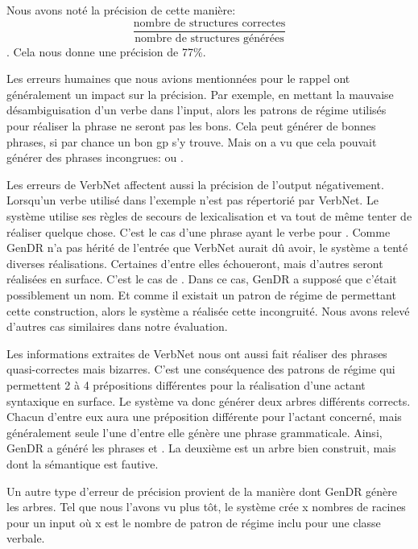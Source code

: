 Nous avons noté la précision de cette manière:\[\frac{\text{nombre de structures correctes}}{\text{nombre de structures générées}}\]. Cela nous donne une précision de 77\%.

Les erreurs humaines que nous avions mentionnées pour le rappel ont généralement un impact sur la précision. Par exemple, en mettant la mauvaise désambiguisation d'un verbe dans l'input, alors les patrons de régime utilisés pour réaliser la phrase ne seront pas les bons. Cela peut générer de bonnes phrases, si par chance un bon gp s'y trouve. Mais on a vu que cela pouvait générer des phrases incongrues:  ou .

Les erreurs de VerbNet affectent aussi la précision de l'output négativement. Lorsqu'un verbe utilisé dans l'exemple n'est pas répertorié par VerbNet. Le système utilise ses règles de secours de lexicalisation et va tout de même tenter de réaliser quelque chose. C'est le cas d'une phrase ayant le verbe  pour . Comme GenDR n'a pas hérité de l'entrée que VerbNet aurait dû avoir, le système a tenté diverses réalisations. Certaines d'entre elles échoueront, mais d'autres seront réalisées en surface. C'est le cas de . Dans ce cas, GenDR a supposé que c'était possiblement un nom. Et comme il existait un patron de régime de  permettant cette construction, alors le système a réalisée cette incongruité. Nous avons relevé d'autres cas similaires dans notre évaluation.

Les informations extraites de VerbNet nous ont aussi fait réaliser des phrases quasi-correctes mais bizarres. C'est une conséquence des patrons de régime qui permettent 2 à 4 prépositions différentes pour la réalisation d'une actant syntaxique en surface. Le système va donc générer deux arbres différents corrects. Chacun d'entre eux aura une préposition différente pour l'actant concerné, mais généralement seule l'une d'entre elle génère une phrase grammaticale. Ainsi, GenDR a généré les phrases  et . La deuxième est un arbre bien construit, mais dont la sémantique est fautive.

Un autre type d'erreur de précision provient de la manière dont GenDR génère les arbres. Tel que nous l'avons vu plus tôt, le système crée x nombres de racines pour un input où x est le nombre de patron de régime inclu pour une classe verbale. 

